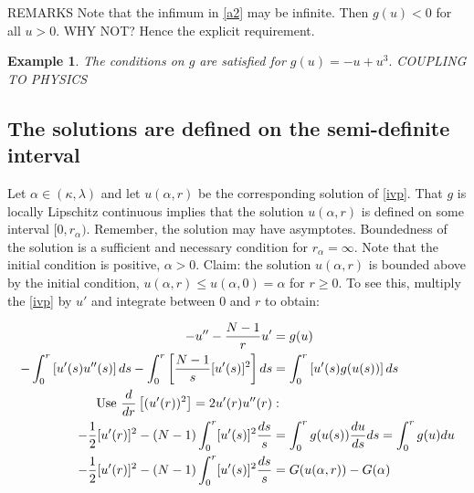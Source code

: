{\color{red}REMARKS} Note that the infimum in \eqref{a2} may be infinite. Then $g(u)<0$ for all $u>0$. {\color{red}WHY NOT?} Hence the explicit requirement.

\newtheorem{example}{Example}
\begin{example} The conditions on $g$ are satisfied for $g(u)=-u+u^3.$ {\color{red}COUPLING TO PHYSICS}
\end{example}

\subsection{The solutions are defined on the semi-definite interval}\hfill\label{semidef}

Let $\alpha\in(\kappa,\lambda)$ and let $u(\alpha,r)$ be the corresponding solution of \eqref{ivp}. That $g$ is locally Lipschitz continuous implies that the solution $u(\alpha,r)$ is defined on some interval $[0,r_\alpha)$. Remember, the solution may have asymptotes. Boundedness of the solution is a sufficient and necessary condition for $r_\alpha=\infty$. Note that the initial condition is positive, $\alpha>0$. Claim: the solution $u(\alpha,r)$ is bounded above by the initial condition, $u(\alpha,r)\leq u(\alpha,0)=\alpha$ for $r\geq0$. To see this, multiply the \eqref{ivp} by $u'$ and integrate between 0 and $r$ to obtain:

\begin{align}\label{ivpint}
-u''-\frac{N-1}{r}u'&=g(u)\nonumber\\
-\int_0^r\left[u'(s)u''(s)\right]ds-\int_0^r\left[\frac{N-1}{s}[u'(s)]^2\right]ds&=\int_0^r\left[u'(s)g(u(s))\right]ds\nonumber\\
\notag\text{Use }\frac{d}{dr}\left[(u'(r))^2\right]=2u'(r)u''(r)&:\\
-\frac{1}{2}[u'(r)]^2-(N-1)\int_0^r[u'(s)]^2\frac{ds}{s}&=\int_0^r g(u(s))\frac{du}{ds}ds=\int_0^r g(u)du\nonumber\\
-\frac{1}{2}[u'(r)]^2-(N-1)\int_0^r[u'(s)]^2\frac{ds}{s}&=G(u(\alpha,r))-G(\alpha)
\end{align}

